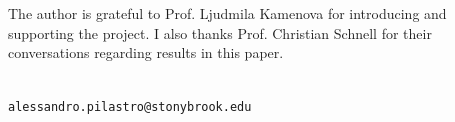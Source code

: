 \documentclass{article}
\begin{document}
The author is grateful to Prof. Ljudmila Kamenova for introducing and supporting the project. I also thanks Prof. Christian Schnell for their conversations regarding results in this paper.



{\small
}

 \\
\tt alessandro.pilastro@stonybrook.edu\\
\end{document}
